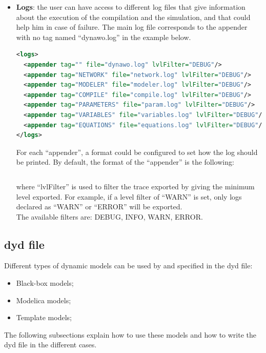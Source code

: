 \documentclass[a4paper, 12pt]{report}
\begin{document}
\begin{itemize}
\item \textbf{Logs}: the user can have access to different log files that give information about the execution of the compilation and the simulation, and that could help him in case of failure. The main log file corresponds to the appender with no tag named ``dynawo.log'' in the example below.
\begin{lstlisting}[language=XML, morekeywords={logs}]
<logs>
  <appender tag="" file="dynawo.log" lvlFilter="DEBUG"/>
  <appender tag="NETWORK" file="network.log" lvlFilter="DEBUG"/>
  <appender tag="MODELER" file="modeler.log" lvlFilter="DEBUG"/>
  <appender tag="COMPILE" file="compile.log" lvlFilter="DEBUG"/>
  <appender tag="PARAMETERS" file="param.log" lvlFilter="DEBUG"/>
  <appender tag="VARIABLES" file="variables.log" lvlFilter="DEBUG"/>
  <appender tag="EQUATIONS" file="equations.log" lvlFilter="DEBUG"/>
</logs>
\end{lstlisting}

For each ``appender'', a format could be configured to set how the log should be printed. By default, the format of the ``appender'' is the following:
\begin{lstlisting}[numbers=none]
%Y-%m-%d %H:%M:%S | <lvlFilter> | log
\end{lstlisting}

where ``lvlFilter'' is used to filter the trace exported by giving the minimum level exported. For example, if a level filter of ``WARN'' is set, only logs declared as ``WARN'' or ``ERROR'' will be exported. \\

The available filters are: DEBUG, INFO, WARN, ERROR.
\end{itemize}

\subsection{dyd file}

Different types of dynamic models can be used by \Dynawo and specified in the dyd file:
\begin{itemize}
\item Black-box models;
\item Modelica models;
\item Template models;
\end{itemize}

The following subsections explain how to use these models and how to write the dyd file in the different cases.
\end{document}
